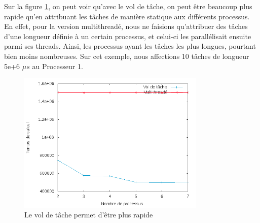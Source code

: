 Sur la figure \ref{fig:sp}, on peut voir qu'avec le vol de tâche, on peut être beaucoup plus rapide qu'en attribuant les tâches de manière statique aux différents processus. En effet, pour la version multithreadé, nous ne faisions qu'attribuer des tâches d'une longueur définie à un certain processus, et celui-ci les parallélisait ensuite parmi ses threads. Ainsi, les processus ayant les tâches les plus longues, pourtant bien moins nombreuses. Sur cet exemple, nous affections 10 tâches de longueur 5e+6 $\mu s$ au Processeur 1.
\begin{figure}[H]
\centering
\includegraphics[width=0.8\textwidth]{stats.png}
\caption{Le vol de tâche permet d'être plus rapide}
\label{fig:sp}
\end{figure}

